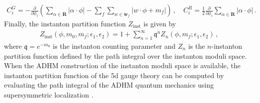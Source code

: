 \documentclass[11pt, a4paper]{article}
\theoremstyle{definition}
\begin{document}
\begin{align}
    C_i^G = -\frac{\partial}{\partial \phi_i} \left( \sum_{\alpha \in \mathbf{R}} |\alpha \cdot \phi| - \sum_f \sum_{w\in \mathbf{w}_f} |w \cdot \phi + m_f| \right) \, , \quad
    C_i^R = \frac{1}{2} \frac{\partial}{\partial \phi_i} \sum_{\alpha \in \mathbf{R}} |\alpha \cdot \phi| \, .
\end{align}
Finally, the instanton partition function $ Z_{\mathrm{inst}} $ is given by
\begin{align}
    Z_{\mathrm{inst}}(\phi,m_0,m_f;\epsilon_1,\epsilon_2) = 1 + \sum_{n=1}^\infty \mathfrak{q}^n Z_n(\phi,m_f; \epsilon_1,\epsilon_2) \, ,
\end{align}
where $ \mathfrak{q} = e^{-m_0} $ is the instanton counting parameter and $ Z_n $ is the $ n $-instanton partition function defined by the path integral over the instanton moduli space. When the ADHM construction of the instanton moduli space is available, the instanton partition function of the 5d gauge theory can be computed by evaluating the path integral of the ADHM quantum mechanics using supersymmetric localization \cite{Nekrasov:2002qd, Nekrasov:2003rj}.
\end{document}
